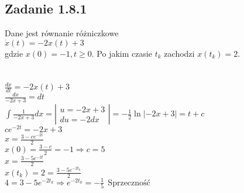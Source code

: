 \pagebreak
\subsection*{Zadanie 1.8.1} {\color{darkgray}
	Dane jest równanie różniczkowe\\
	$\dot{x}(t)=-2x(t)+3$\\
	gdzie $x(0)=-1, t\geqslant 0$. Po jakim czasie $t_k$ zachodzi $x(t_k)=2$.\\
}\lineh
\\\\
$\frac{dx}{dt}=-2x(t)+3$\\
$\frac{dx}{-2x+3}=dt$\\
$\int \frac{1}{-2x+3} dx = \left|\begin{array}{c}u=-2x+3 \\du=-2dx\end{array}\right|=-\frac 12 \ln |-2x+3|=t+c$\\
$ce^{-2t}=-2x+3$\\
$x=\frac{3-ce^{-2t}}{2}$\\
$x(0)=\frac{3-c}{2}=-1 \Rightarrow c=5$\\
$x=\frac{3-5e^{-2t}}{2}$\\
$x(t_k)=2=\frac{3-5e^{-2t_k}}{2}$\\
$4=3-5e^{-2t_k} \Rightarrow e^{-2t_k}=-\frac 15 \ \ \boxed{\text{Sprzeczność}}$\\





\pagebreak
